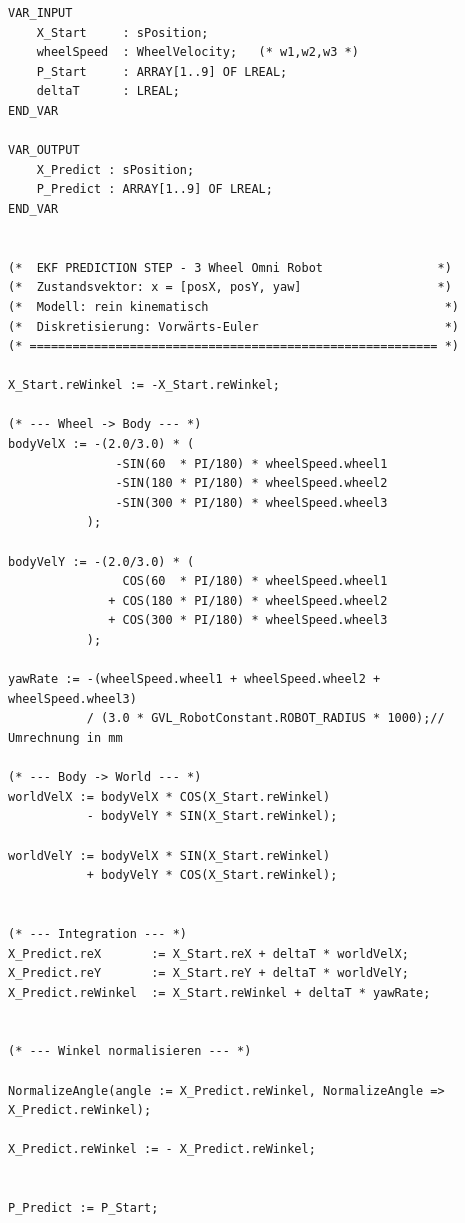 \begin{verbatim}
VAR_INPUT
	X_Start 	: sPosition;
    wheelSpeed 	: WheelVelocity;   (* w1,w2,w3 *)
	P_Start 	: ARRAY[1..9] OF LREAL;
	deltaT 		: LREAL;
END_VAR

VAR_OUTPUT
    X_Predict : sPosition;
	P_Predict : ARRAY[1..9] OF LREAL;
END_VAR


(*  EKF PREDICTION STEP - 3 Wheel Omni Robot                *)
(*  Zustandsvektor: x = [posX, posY, yaw]                   *)
(*  Modell: rein kinematisch                                 *)
(*  Diskretisierung: Vorwärts-Euler                          *)
(* ========================================================= *)

X_Start.reWinkel := -X_Start.reWinkel;

(* --- Wheel -> Body --- *)
bodyVelX := -(2.0/3.0) * (
			   -SIN(60  * PI/180) * wheelSpeed.wheel1
			   -SIN(180 * PI/180) * wheelSpeed.wheel2
			   -SIN(300 * PI/180) * wheelSpeed.wheel3
		   );

bodyVelY := -(2.0/3.0) * (
				COS(60  * PI/180) * wheelSpeed.wheel1
			  + COS(180 * PI/180) * wheelSpeed.wheel2
			  + COS(300 * PI/180) * wheelSpeed.wheel3
		   );

yawRate := -(wheelSpeed.wheel1 + wheelSpeed.wheel2 + wheelSpeed.wheel3) 
		   / (3.0 * GVL_RobotConstant.ROBOT_RADIUS * 1000);// Umrechnung in mm

(* --- Body -> World --- *)
worldVelX := bodyVelX * COS(X_Start.reWinkel)
		   - bodyVelY * SIN(X_Start.reWinkel);

worldVelY := bodyVelX * SIN(X_Start.reWinkel)
		   + bodyVelY * COS(X_Start.reWinkel);


(* --- Integration --- *)
X_Predict.reX 		:= X_Start.reX + deltaT * worldVelX;
X_Predict.reY 		:= X_Start.reY + deltaT * worldVelY;
X_Predict.reWinkel 	:= X_Start.reWinkel + deltaT * yawRate;


(* --- Winkel normalisieren --- *)

NormalizeAngle(angle := X_Predict.reWinkel, NormalizeAngle => X_Predict.reWinkel);

X_Predict.reWinkel := - X_Predict.reWinkel;


P_Predict := P_Start;

\end{verbatim}